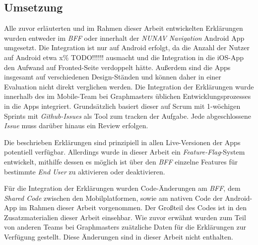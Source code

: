 \subsection{Umsetzung}

Alle zuvor erläuterten und im Rahmen dieser Arbeit entwickelten Erklärungen wurden entweder im \textit{BFF} oder innerhalt der \textit{NUNAV Navigation} Android App umgesetzt. Die Integration ist nur auf Android erfolgt, da die Anzahl der Nutzer auf Android etwa x\% TODO!!!!!! ausmacht und die Integration in die iOS-App den Aufwand auf Fronted-Seite verdoppelt hätte. Außerdem sind die Apps insgesamt auf verschiedenen Design-Ständen und können daher in einer Evaluation nicht direkt verglichen werden. Die Integration der Erklärungen wurde innerhalb des im Mobile-Team bei Graphmasters üblichen Entwicklungsprozesses in die Apps integriert. Grundsätzlich basiert dieser auf Scrum mit 1-wöchigen Sprints mit \textit{Github-Issues} als Tool zum tracken der Aufgabe. Jede abgeschlossene \textit{Issue} muss darüber hinaus ein Review erfolgen.

Die beschrieben Erklärungen sind prinzipiell in allen Live-Versionen der Apps potentiell verfügbar. Allerdings wurde in dieser Arbeit ein \textit{Feature-Flag}-System entwickelt, mithilfe dessen es möglich ist über den \textit{BFF} einzelne Features für bestimmte \textit{End User} zu aktivieren oder deaktivieren.

Für die Integration der Erklärungen wurden Code-Änderungen am \textit{BFF}, dem \textit{Shared Code} zwischen den Mobilplatformen, sowie am nativen Code der Android-App im Rahmen dieser Arbeit vorgenommen. Der Großteil des Codes ist in den Zusatzmaterialien dieser Arbeit einsehbar. Wie zuvor erwähnt wurden zum Teil von anderen Teams bei Graphmasters zuätzliche Daten für die Erklärungen zur Verfügung gestellt. Diese Änderungen sind in dieser Arbeit nicht enthalten.

\newpage